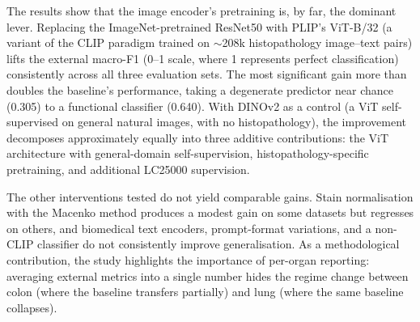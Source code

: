 The results show that the image encoder's pretraining is, by far, the dominant lever. Replacing the ImageNet-pretrained ResNet50 with PLIP's ViT-B/32 (a variant of the CLIP paradigm trained on $\sim$208k histopathology image--text pairs) lifts the external macro-F1 (0--1 scale, where 1 represents perfect classification) consistently across all three evaluation sets. The most significant gain more than doubles the baseline's performance, taking a degenerate predictor near chance (0.305) to a functional classifier (0.640). With DINOv2 as a control (a ViT self-supervised on general natural images, with no histopathology), the improvement decomposes approximately equally into three additive contributions: the ViT architecture with general-domain self-supervision, histopathology-specific pretraining, and additional LC25000 supervision.

The other interventions tested do not yield comparable gains. Stain normalisation with the Macenko method produces a modest gain on some datasets but regresses on others, and biomedical text encoders, prompt-format variations, and a non-CLIP classifier do not consistently improve generalisation. As a methodological contribution, the study highlights the importance of per-organ reporting: averaging external metrics into a single number hides the regime change between colon (where the baseline transfers partially) and lung (where the same baseline collapses).
